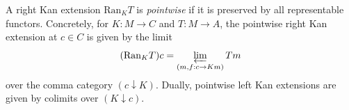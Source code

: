 A right Kan extension $\mathrm{Ran}_K T$ is \emph{pointwise} if it is preserved by all representable functors. Concretely, for $K: M \to C$ and $T: M \to A$, the pointwise right Kan extension at $c \in C$ is given by the limit
$$(\mathrm{Ran}_K T)c = \varprojlim_{(m, f: c \to Km)} Tm$$
over the comma category $(c \downarrow K)$. Dually, pointwise left Kan extensions are given by colimits over $(K \downarrow c)$.
